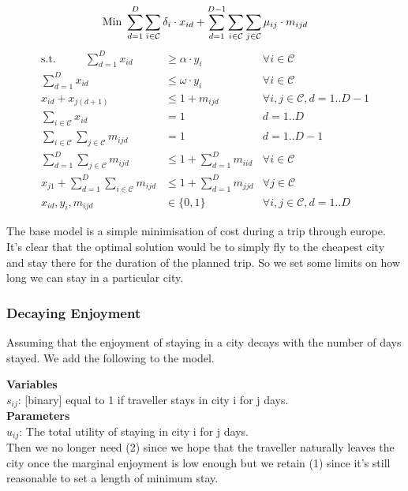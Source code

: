 \documentclass[12pt]{article}
\begin{document}
\begin{equation*}
\text{Min } \sum_{d=1}^{D} \sum_{i \in \mathcal{C}} \delta_{i} \cdot x_{id} + \sum_{d=1}^{D-1} \sum_{i \in \mathcal{C}} \sum_{j \in \mathcal{C}} \mu_{ij} \cdot m_{ijd}\\
\end{equation*}
\begin{align}
\text{s.t.~~~~~~~~} \sum_{d=1}^{D} x_{id} & \geq \alpha \cdot y_{i} & \forall i \in \mathcal{C}\\
\sum_{d=1}^{D} x_{id} & \leq \omega \cdot y_{i} &  \forall i \in \mathcal{C}\\
x_{id} + x_{j(d+1)} & \leq 1 + m_{ijd} & \forall i,j \in \mathcal{C}, d = 1..D-1 \\
\sum_{i \in \mathcal{C}} x_{id} &= 1 & d = 1..D \\
\sum_{i \in \mathcal{C}} \sum_{j \in \mathcal{C}} m_{ijd} &= 1 & d = 1..D-1 \\
\sum_{d=1}^{D} \sum_{j \in \mathcal{C}} m_{ijd} &\leq 1 + \sum_{d=1}^{D} m_{iid} & \forall i \in \mathcal{C} \\
x_{j1} + \sum_{d=1}^{D} \sum_{i \in \mathcal{C}} m_{ijd} &\leq 1 + \sum_{d=1}^{D} m_{jjd} & \forall j \in \mathcal{C}\\
x_{id}, y_{i}, m_{ijd} & \in \{0,1\} & \forall i, j \in \mathcal{C}, d = 1..D
\end{align}

The base model is a simple minimisation of cost during a trip through europe. It's clear that the optimal solution would be to simply fly to the cheapest city and stay there for the duration of the planned trip. So we set some limits on how long we can stay in a particular city.

\newpage
\subsubsection{Decaying Enjoyment}
Assuming that the enjoyment of staying in a city decays with the number of days stayed. We add the following to the model.

\textbf{Variables}\\
$s_{ij}$: [binary] equal to 1 if traveller stays in city i for j days.\\

\textbf{Parameters} \\
$u_{ij}$: The total utility of staying in city i for j days.\\

Then we no longer need (2) since we hope that the traveller naturally leaves the city once the marginal enjoyment is low enough but we retain (1) since it's still reasonable to set a length of minimum stay.
\end{document}
